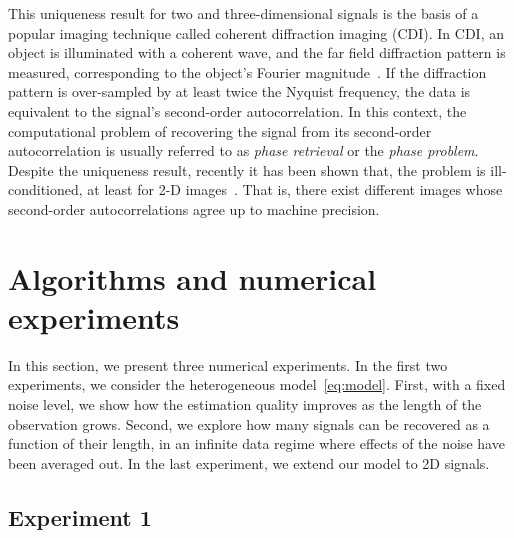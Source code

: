 \documentclass[12pt]{article}
\newcommand{\1}{\mathbf{1}}
\theoremstyle{plain}
\theoremstyle{definition}
\theoremstyle{remark}
\theoremstyle{plain}
\theoremstyle{remark}
\theoremstyle{plain}
\theoremstyle{plain}
\theoremstyle{plain}
\numberwithin{equation}{section}
\begin{document}
This uniqueness result for two and three-dimensional signals is the basis of a popular imaging technique called coherent diffraction imaging (CDI). In CDI, an object is
illuminated with a coherent wave, and the far field diffraction pattern  is measured, corresponding to the object's Fourier magnitude~\cite{miao1999extending,shechtman2015phase}. 
If the diffraction pattern is over-sampled by at least  twice the Nyquist frequency,  the data is equivalent to the signal's second-order autocorrelation. In this context, the computational problem of recovering the signal from its second-order autocorrelation is usually referred to as \emph{phase retrieval} or the \emph{phase problem}.
Despite the uniqueness result, recently it has been shown that, the problem is  ill-conditioned, at least for 2-D images~\cite{barnett2018geometry}. That is, there exist different images whose second-order autocorrelations agree up to machine precision. 



\section{Algorithms and numerical experiments} \label{sec:numerics}



In this section, we present three numerical experiments. In the first two experiments, we consider the heterogeneous model~\eqref{eq:model}. First, with a fixed noise level, we show how the estimation quality improves as the length of the observation grows. Second, we explore how many signals can be recovered as a function of their length, in an infinite data regime where effects of the noise have been averaged out. In the last experiment, we extend our model to 2D signals.

\subsection{Experiment 1} \label{sec:XP1}
\end{document}

